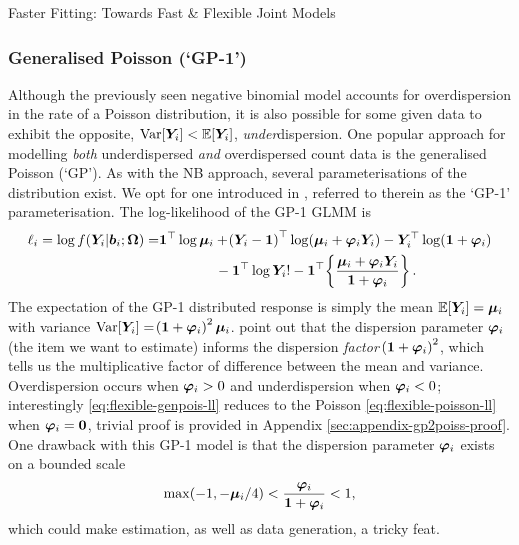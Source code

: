 \begin{chapter}{\label{cha:flexible}Faster Fitting: Towards Fast \& Flexible Joint Models}
\subsubsection*{Generalised Poisson (`GP-1')}
Although the previously seen negative binomial model accounts for overdispersion in the rate of a Poisson distribution, it is also possible for some given data to exhibit the opposite, $\mathrm{Var}\!\left[\bm{Y}_i\right]<\operatorname{\mathbb{E}}\!\left[\bm{Y}_i\right]$, \textit{under}dispersion. One popular approach for modelling \textit{both} underdispersed \textit{and} overdispersed count data is the generalised Poisson (`GP'). As with the NB approach, several parameterisations of the distribution exist. We opt for one introduced in \citet{Zamani2012}, referred to therein as the `GP-1' parameterisation. The log-likelihood of the GP-1 GLMM is  
\begin{equation}
  \begin{aligned}
        \ell_i=\log f\!\left(\bm{Y}_i|\bm{b}_i;\bm{\mathrm{\Omega}}\right)=&\bm{1}^\top\log\bm{\mu}_i+\!\left(\bm{Y}_i-\bm{1}\right)^\top\log\!\left(\bm{\mu}_i+\bm{\varphi}_i\bm{Y}_i\right)-\bm{Y}_i^\top\log\!\left(\bm{1}+\bm{\varphi}_i\right)\\
        &\qquad\qquad-\bm{1}^\top\log\bm{Y}_i!-\bm{1}^\top\!\left\{\frac{\bm{\mu}_i+\bm{\varphi}_i\bm{Y}_i}{\bm{1}+\bm{\varphi}_i}\right\}.
  \end{aligned}
\label{eq:flexible-genpois-ll}    
\end{equation}
The expectation of the GP-1 distributed response is simply the mean $\operatorname{\mathbb{E}}\!\left[\bm{Y}_i\right]=\bm{\mu}_i$ with variance $\mathrm{Var}\!\left[\bm{Y}_i\right]=\!\left(\bm{1}+\bm{\varphi}_i\right)^2\bm{\mu}_i$. \citet{Zamani2012} point out that the dispersion parameter $\bm{\varphi}_i$ (the item we want to estimate) informs the dispersion \textit{factor} $\!\left(\bm{1}+\bm{\varphi}_i\right)^2$, which tells us the multiplicative factor of difference between the mean and variance. Overdispersion occurs when $\bm{\varphi}_i>0$ and underdispersion when $\bm{\varphi}_i<0$; interestingly \eqref{eq:flexible-genpois-ll} reduces to the Poisson \eqref{eq:flexible-poisson-ll} when $\bm{\varphi}_i=\bm{0}$, trivial proof is provided in Appendix \ref{sec:appendix-gp2poiss-proof}. One drawback with this GP-1 model is that the dispersion parameter $\bm{\varphi}_i$ exists on a bounded scale
\begin{equation}
    \max\!\left(-1,-\bm{\mu}_i/4\right)<\frac{\bm{\varphi}_i}{\bm{1}+\bm{\varphi}_i}<1,
\label{eq:flexible-genpois-phibound}
\end{equation}
which could make estimation, as well as data generation, a tricky feat.

\end{chapter}
